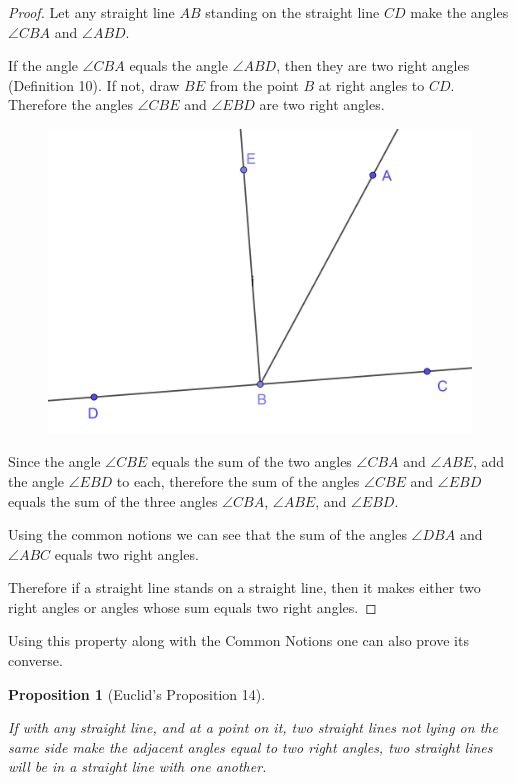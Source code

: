 \documentclass[
]{book}
\newtheorem{proposition}{Proposition}[chapter]
\theoremstyle{definition}
\theoremstyle{definition}
\theoremstyle{definition}
\theoremstyle{definition}
\theoremstyle{remark}
\begin{document}
\begin{proof}

Let any straight line \(AB\) standing on the straight line \(CD\) make the angles \(\angle CBA\) and \(\angle ABD\).

If the angle \(\angle CBA\) equals the angle \(\angle ABD\), then they are two right angles (Definition 10). If not, draw \(BE\) from the point \(B\) at right angles to \(CD\). Therefore the angles \(\angle CBE\) and \(\angle EBD\) are two right angles.

\begin{figure}

{\centering \includegraphics[width=0.5\linewidth]{images/Prop13} 

}

\end{figure}

Since the angle \(\angle CBE\) equals the sum of the two angles \(\angle CBA\) and \(\angle ABE\), add the angle \(\angle EBD\) to each, therefore the sum of the angles \(\angle CBE\) and \(\angle EBD\) equals the sum of the three angles \(\angle CBA\), \(\angle ABE\), and \(\angle EBD\).

Using the common notions we can see that the sum of the angles \(\angle DBA\) and \(\angle ABC\) equals two right angles.

Therefore if a straight line stands on a straight line, then it makes either two right angles or angles whose sum equals two right angles.

\end{proof}

Using this property along with the Common Notions one can also prove its converse.

\begin{proposition}[Euclid's Proposition 14]
\protect\hypertarget{prp:prop14}{}\label{prp:prop14}

If with any straight line, and at a point on it, two straight lines not lying on the same side make the adjacent angles equal to two right angles, two straight lines will be in a straight line with one another.

\end{proposition}
\end{document}
